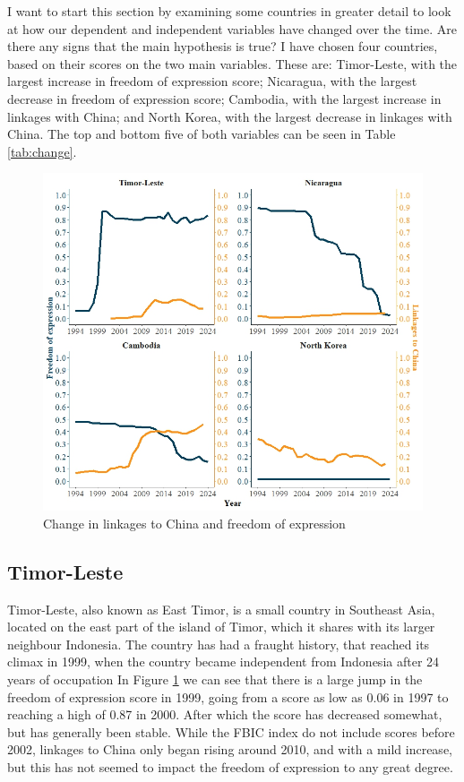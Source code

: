 I want to start this section by examining some countries in greater detail to look at how our dependent and independent variables have changed over the time. Are there any signs that the main hypothesis is true? I have chosen four countries, based on their scores on the two main variables. These are: Timor-Leste, with the largest increase in freedom of expression score; Nicaragua, with the largest decrease in freedom of expression score; Cambodia, with the largest increase in linkages with China; and North Korea, with the largest decrease in linkages with China. The top and bottom five of both variables can be seen in Table \ref{tab:change}.

\begin{figure}[H]
    \centering
    \includegraphics[width=\linewidth]{graphics/single_country_plots.jpeg}
    \caption{Change in linkages to China and freedom of expression}
    \label{fig:scp}
\end{figure}


\subsection{Timor-Leste}
Timor-Leste, also known as East Timor, is a small country in Southeast Asia, located on the east part of the island of Timor, which it shares with its larger neighbour Indonesia. The country has had a fraught history, that reached its climax in 1999, when the country became independent from Indonesia after 24 years of occupation \citep[p. 183]{kingsbury_democratic_2014} In Figure \ref{fig:scp} we can see that there is a large jump in the freedom of expression score in 1999, going from a score as low as 0.06 in 1997 to reaching a high of 0.87 in 2000. After which the score has decreased somewhat, but has generally been stable. While the FBIC index do not include scores before 2002, linkages to China only began rising around 2010, and with a mild increase, but this has not seemed to impact the freedom of expression to any great degree.

